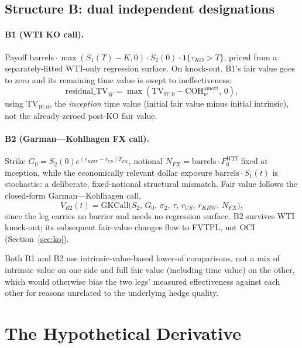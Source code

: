 \documentclass[11pt,a4paper]{article}
\begin{document}
\subsection{Structure B: dual independent designations}
\label{sec:structB}

\paragraph{B1 (WTI KO call).} Payoff $\mathrm{barrels}\cdot\max(S_1(T)-K,0)\cdot S_2(0)\cdot\mathbf 1\{\tau_{KO}>T\}$, priced from a separately-fitted WTI-only regression surface. On knock-out, B1's fair value goes to zero and its remaining time value is swept to ineffectiveness:
\begin{equation}
\text{residual\_TV}_W = \max(\mathrm{TV}_{W,0}-\mathrm{COH}^{\mathrm{amort}}_w,\,0),
\end{equation}
using $\mathrm{TV}_{W,0}$, the \emph{inception} time value (initial fair value minus initial intrinsic), not the already-zeroed post-KO fair value.

\paragraph{B2 (Garman---Kohlhagen FX call).} Strike $G_0=S_2(0)e^{(r_{KRW}-r_{US})T_{FX}}$, notional $N_{FX}=\mathrm{barrels}\cdot F_0^{WTI}$ fixed at inception, while the economically relevant dollar exposure $\mathrm{barrels}\cdot S_1(t)$ is stochastic: a deliberate, fixed-notional structural mismatch. Fair value follows the closed-form Garman---Kohlhagen call,
\begin{equation}
V_{B2}(t) = \mathrm{GKCall}\big(S_2,\,G_0,\,\sigma_2,\,\tau,\,r_{US},\,r_{KRW},\,N_{FX}\big),
\end{equation}
since the leg carries no barrier and needs no regression surface. B2 survives WTI knock-out; its subsequent fair-value changes flow to FVTPL, not OCI (Section~\ref{sec:ko}).

Both B1 and B2 use intrinsic-value-based lower-of comparisons, not a mix of intrinsic value on one side and full fair value (including time value) on the other, which would otherwise bias the two legs' measured effectiveness against each other for reasons unrelated to the underlying hedge quality.

\section{The Hypothetical Derivative}
\label{sec:hd}
\end{document}
